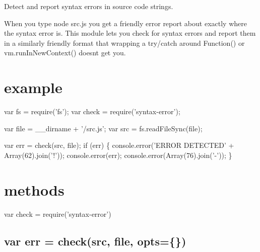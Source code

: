 Detect and report syntax errors in source code strings.

\href{http://travis-ci.org/substack/node-syntax-error}{\tt }

When you type {\ttfamily node src.\+js} you get a friendly error report about exactly where the syntax error is. This module lets you check for syntax errors and report them in a similarly friendly format that wrapping a try/catch around {\ttfamily Function()} or {\ttfamily vm.\+run\+In\+New\+Context()} doesn\textquotesingle{}t get you.

\section*{example}


\begin{DoxyCode}
var fs = require('fs');
var check = require('syntax-error');

var file = \_\_dirname + '/src.js';
var src = fs.readFileSync(file);

var err = check(src, file);
if (err) \{
    console.error('ERROR DETECTED' + Array(62).join('!'));
    console.error(err);
    console.error(Array(76).join('-'));
\}
\end{DoxyCode}
 






\section*{methods}


\begin{DoxyCode}
var check = require('syntax-error')
\end{DoxyCode}


\subsection*{var err = check(src, file, opts=\{\})}

